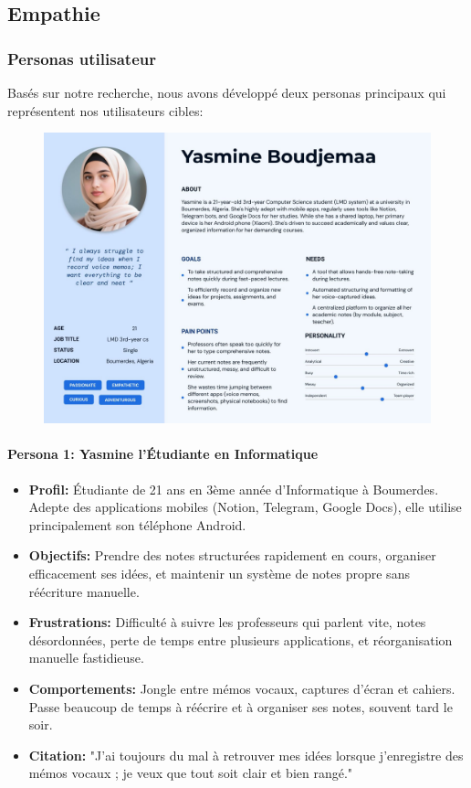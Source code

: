     \subsection{Empathie}
    
    \subsubsection{Personas utilisateur}
    
    Basés sur notre recherche, nous avons développé deux personas principaux qui représentent nos utilisateurs cibles:
    
    \begin{figure}[H]
        \centering
        \includegraphics[width=\textwidth]{assets/docs/yassmine-personaa.jpg}
    \end{figure}
    
    \paragraph{Persona 1: Yasmine l'Étudiante en Informatique}
    
    
    \begin{itemize}
        \item \textbf{Profil:} Étudiante de 21 ans en 3ème année d'Informatique à Boumerdes. Adepte des applications mobiles (Notion, Telegram, Google Docs), elle utilise principalement son téléphone Android.
        \item \textbf{Objectifs:} Prendre des notes structurées rapidement en cours, organiser efficacement ses idées, et maintenir un système de notes propre sans réécriture manuelle.
        \item \textbf{Frustrations:} Difficulté à suivre les professeurs qui parlent vite, notes désordonnées, perte de temps entre plusieurs applications, et réorganisation manuelle fastidieuse.
        \item \textbf{Comportements:} Jongle entre mémos vocaux, captures d'écran et cahiers. Passe beaucoup de temps à réécrire et à organiser ses notes, souvent tard le soir.
        \item \textbf{Citation:} "J'ai toujours du mal à retrouver mes idées lorsque j'enregistre des mémos vocaux ; je veux que tout soit clair et bien rangé."
    \end{itemize}

